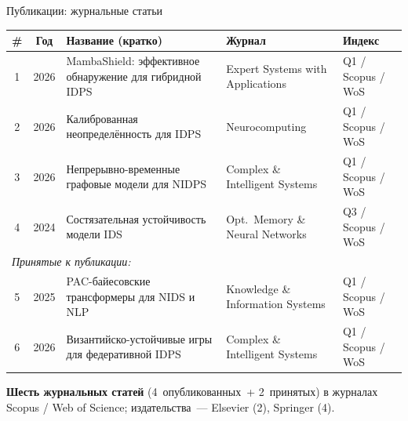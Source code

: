 \documentclass[10pt,aspectratio=169]{beamer}
\newcommand{\hl}[1]{\textcolor{accent}{\textbf{#1}}}
\begin{document}
\begin{frame}{Публикации: журнальные статьи}
\scriptsize
\begin{tabular}{cclll}
\toprule
\# & Год & Название (кратко) & Журнал & Индекс \\
\midrule
1 & 2026 & MambaShield: эффективное обнаружение для гибридной IDPS & Expert Systems with Applications & Q1 / Scopus / WoS \\
2 & 2026 & Калиброванная неопределённость для IDPS & Neurocomputing & Q1 / Scopus / WoS \\
3 & 2026 & Непрерывно-временные графовые модели для NIDPS & Complex \& Intelligent Systems & Q1 / Scopus / WoS \\
4 & 2024 & Состязательная устойчивость модели IDS & Opt.\ Memory \& Neural Networks & Q3 / Scopus / WoS \\
\midrule
\multicolumn{5}{l}{\textit{Принятые к публикации:}} \\
5 & 2025 & PAC-байесовские трансформеры для NIDS и NLP & Knowledge \& Information Systems & Q1 / Scopus / WoS \\
6 & 2026 & Византийско-устойчивые игры для федеративной IDPS & Complex \& Intelligent Systems & Q1 / Scopus / WoS \\
\bottomrule
\end{tabular}
\medskip
\begin{block}{}
\small \hl{Шесть журнальных статей} (4~опубликованных~+
2~принятых) в журналах Scopus / Web of Science;
издательства~--- Elsevier (2), Springer (4).
\end{block}
\end{frame}
\end{document}

